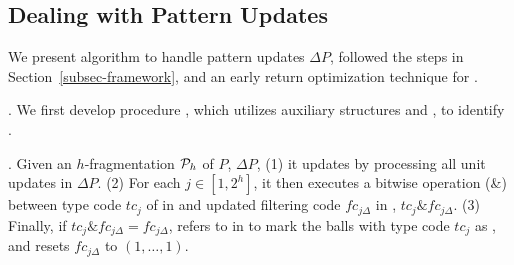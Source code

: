 \subsection{Dealing with Pattern Updates}
\label{subsec-Qinc}

We present algorithm \incp to handle pattern updates $\Delta P$, followed the steps in Section~\ref{subsec-framework}, and
an early return optimization technique for \incp.











. 
We first develop procedure \identifyaffball,
which utilizes auxiliary structures \fb and \bfc, to identify \affballsx.

.
Given an $h$-fragmentation ${\cal P}_{h}$ of $P$, $\Delta P$,
(1) it updates \bfc by processing all unit updates in $\Delta P$.
(2) For each $j\in [1, 2^h]$, it then executes a bitwise  operation (\&) between type code $tc_j$ of \fs in \fb and updated filtering code $fc_{j\Delta}$ in \bfc, \ie $tc_j\& fc_{j\Delta}$.
(3) Finally, if $tc_j\& fc_{j\Delta} = fc_{j\Delta}$, \identifyaffball refers to \bs in \fb to mark the balls with type code $tc_j$ as \affballsx, and resets $fc_{j\Delta}$ to $(1, \ldots, 1)$.




